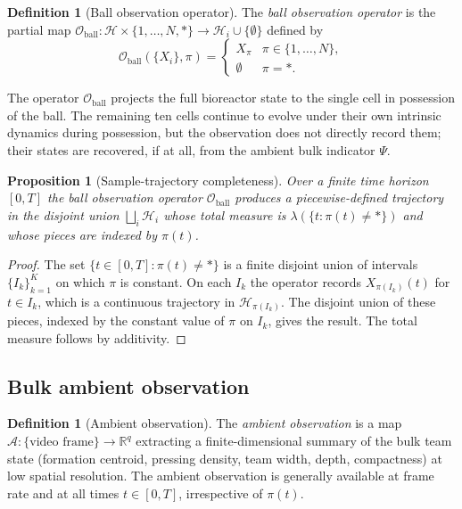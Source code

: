 \documentclass[11pt,twocolumn,a4paper]{article}
\newtheorem{proposition}[theorem]{Proposition}
\theoremstyle{definition}
\newtheorem{definition}[theorem]{Definition}
\theoremstyle{remark}
\newcommand{\Hcal}{\mathcal{H}}
\newcommand{\Ocal}{\mathcal{O}}
\newcommand{\Acal}{\mathcal{A}}
\begin{document}
\begin{definition}[Ball observation operator]
\label{def:obs}
The \emph{ball observation operator} is the partial map
$\Ocal_{\mathrm{ball}} : \Hcal \times \{1,\ldots,N,*\} \to \Hcal_i \cup \{\emptyset\}$
defined by
\begin{equation}
  \Ocal_{\mathrm{ball}}\!\left(\{X_i\},\pi\right) =
  \begin{cases}
    X_{\pi} & \pi \in \{1,\ldots,N\}, \\
    \emptyset & \pi = *.
  \end{cases}
\end{equation}
\end{definition}

The operator $\Ocal_{\mathrm{ball}}$ projects the full bioreactor state
to the single cell in possession of the ball. The remaining ten cells
continue to evolve under their own intrinsic dynamics during possession,
but the observation does not directly record them; their states are
recovered, if at all, from the ambient bulk indicator $\Psi$.

\begin{proposition}[Sample-trajectory completeness]
\label{prop:complete}
Over a finite time horizon $[0,T]$ the ball observation operator
$\Ocal_{\mathrm{ball}}$ produces a piecewise-defined trajectory in the
disjoint union $\bigsqcup_i \Hcal_i$ whose total measure is
$\lambda(\{t : \pi(t) \neq *\})$ and whose pieces are indexed by
$\pi(t)$.
\end{proposition}

\begin{proof}
The set $\{t \in [0,T] : \pi(t) \neq *\}$ is a finite disjoint union
of intervals $\{I_k\}_{k=1}^{K}$ on which $\pi$ is constant. On each
$I_k$ the operator records $X_{\pi(I_k)}(t)$ for $t \in I_k$, which is
a continuous trajectory in $\Hcal_{\pi(I_k)}$. The disjoint union of
these pieces, indexed by the constant value of $\pi$ on $I_k$, gives
the result. The total measure follows by additivity.
\end{proof}

\subsection{Bulk ambient observation}

\begin{definition}[Ambient observation]
\label{def:ambient}
The \emph{ambient observation} is a map $\Acal :
\{\text{video frame}\} \to \mathbb{R}^{q}$ extracting a finite-dimensional
summary of the bulk team state (formation centroid, pressing density,
team width, depth, compactness) at low spatial resolution. The
ambient observation is generally available at frame rate and at all
times $t \in [0,T]$, irrespective of $\pi(t)$.
\end{definition}
\end{document}
